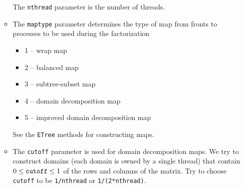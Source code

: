 \begin{enumerate}
\begin{itemize}
The {\tt nthread} parameter is the number of threads.
\item
The {\tt maptype} parameter determines the type of map from fronts
to processes to be used during the factorization
\begin{itemize}
\item 1 -- wrap map
\item 2 -- balanced map
\item 3 -- subtree-subset map
\item 4 -- domain decomposition map
\item 5 -- improved domain decomposition map
\end{itemize}
See the {\tt ETree} methods for constructing maps.
\item
The {\tt cutoff} parameter is used for domain decomposition maps.
We try to construct domains (each domain is owned by a single
thread) that contain $0 \le {\tt cutoff} \le 1$ of the rows and
columns of the matrix.
Try to choose {\tt cutoff} to be {\tt 1/nthread}
or {\tt 1/(2*nthread)}.
\end{itemize}
\end{enumerate}
